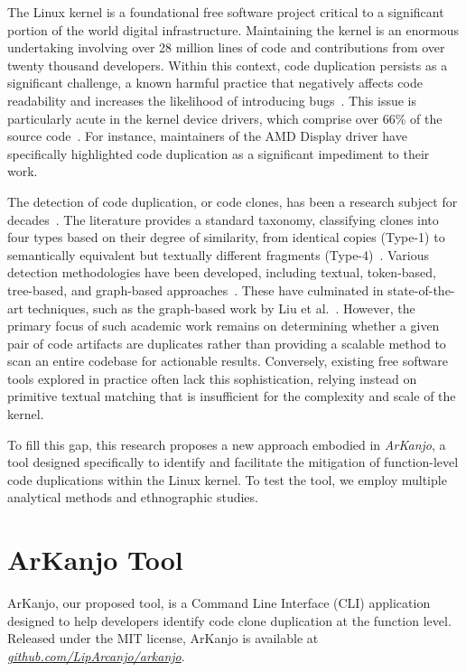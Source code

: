 \documentclass[conference]{IEEEtran}
\begin{document}
The Linux kernel is a foundational free software project 
critical to a significant portion of the world digital infrastructure. Maintaining 
the kernel is an enormous undertaking involving over 28 million lines of code 
and contributions from over twenty thousand developers. Within this context, code 
duplication persists as a significant challenge, a known harmful practice that 
negatively affects code readability and increases the likelihood of introducing
bugs~\cite{harmone,harmtwo}. This issue is particularly acute in the 
kernel device drivers, which comprise over 66\% of the source code~\cite{marcelo}. 
For instance, maintainers of the AMD Display driver have specifically highlighted code 
duplication as a significant impediment to their work.

The detection of code duplication, or code clones, has been a research subject for 
decades~\cite{firstman}. The literature provides a standard taxonomy, classifying 
clones into four types based on their degree of similarity, from identical copies 
(Type-1) to semantically equivalent but textually different fragments (Type-4)~\cite{litreview}. 
Various detection methodologies have been developed, including textual, token-based, 
tree-based, and graph-based approaches~\cite{litreview}. These have culminated in 
state-of-the-art techniques, such as the graph-based work by Liu et al.~\cite{tailor}. 	
However, the primary focus of such academic work remains on determining whether a given 
pair of code artifacts are duplicates rather than providing a scalable method to scan 
an entire codebase for actionable results. Conversely, existing free software tools explored 
in practice often lack this sophistication, relying instead on primitive textual matching 
that is insufficient for the complexity and scale of the kernel.

To fill this gap, this research proposes a new approach embodied in \textit{ArKanjo}, a tool 
designed specifically to identify and facilitate the mitigation of function-level code 
duplications within the Linux kernel. To test the tool, we employ multiple analytical 
methods and ethnographic studies.


\section{ArKanjo Tool}

ArKanjo, our proposed tool, is a Command Line Interface (CLI) application designed to
help developers identify code clone duplication at the function level. Released under the
MIT license, ArKanjo is available at \textit{\url{github.com/LipArcanjo/arkanjo}}.
\end{document}
